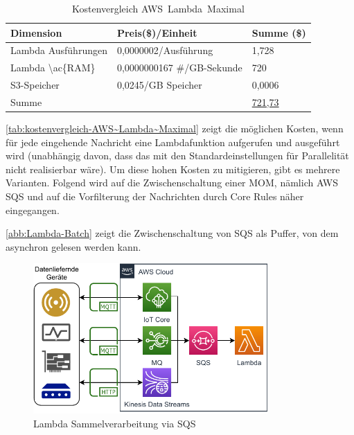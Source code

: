 
\begin{table}[H]
\centering
\begin{tabular}{|l|l|l|}
\hline
Dimension & Preis(\$)/Einheit & Summe (\$) \\ \hline
Lambda Ausführungen & 0,0000002/Ausführung & 1,728 \\ \hline
Lambda \textbackslash{}ac\{RAM\} & 0,0000000167 \#/GB-Sekunde & 720 \\ \hline
\ac{S3}-Speicher & 0,0245/GB Speicher & 0,0006 \\ \hline
Summe &  & \underline{721,73} \\ \hline
\end{tabular}
\caption{Kostenvergleich AWS~Lambda~Maximal}
\label{tab:kostenvergleich-AWS~Lambda~Maximal}
\end{table}

\autoref{tab:kostenvergleich-AWS~Lambda~Maximal} zeigt die möglichen Kosten, wenn für jede eingehende Nachricht eine Lambdafunktion aufgerufen und ausgeführt wird (unabhängig davon, dass das mit den Standardeinstellungen für Parallelität nicht realisierbar wäre). Um diese hohen Kosten zu mitigieren, gibt es mehrere Varianten. Folgend wird auf die Zwischenschaltung einer \ac{MOM}, nämlich \ac{AWS} \ac{SQS} und auf die Vorfilterung der Nachrichten durch \AWSIOT{} Core Rules näher eingegangen.

\autoref{abb:Lambda-Batch} zeigt die Zwischenschaltung von \ac{SQS} als Puffer, von dem asynchron gelesen werden kann.

\begin{figure}[H]
\centering
\includegraphics[width=0.8\textwidth]{graphics/Lambda-Batch.pdf}
\caption{Lambda Sammelverarbeitung via SQS}
\label{abb:Lambda-Batch}
\end{figure}


